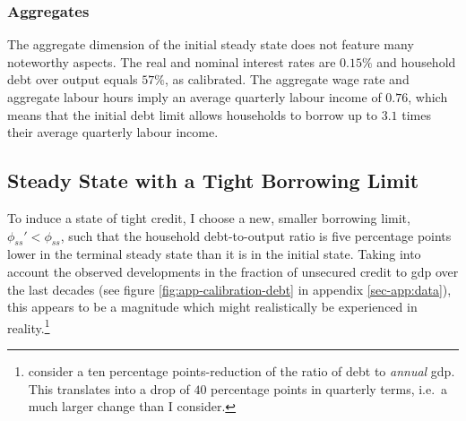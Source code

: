 \documentclass[12pt]{article} %
\numberwithin{equation}{section} %
\numberwithin{figure}{section}
\numberwithin{table}{section}
\begin{document}



\subsubsection*{Aggregates}

The aggregate dimension of the initial steady state does not feature many noteworthy aspects. The real and nominal interest rates are $0.15\%$ and household debt over output equals $57\%$, as calibrated. The aggregate wage rate and aggregate labour hours imply an average quarterly labour income of $0.76$, which means that the initial debt limit allows households to borrow up to $3.1$ times their average quarterly labour income. 

\subsection{Steady State with a Tight Borrowing Limit}
\label{sec:limit-stst-tight}

To induce a state of tight credit, I choose a new, smaller borrowing limit, $\phi_{ss}' < \phi_{ss}$, such that the household debt-to-output ratio is five percentage points lower in the terminal steady state than it is in the initial state. Taking into account the observed developments in the fraction of unsecured credit to \Gls{gdp} over the last decades (see figure \ref{fig:app-calibration-debt} in appendix \ref{sec-app:data}), this appears to be a magnitude which might realistically be experienced in reality.\footnote{\textcite{gl2017} consider a ten percentage points-reduction of the ratio of debt to \textit{annual} \Gls{gdp}. This translates into a drop of $40$ percentage points in quarterly terms, i.e.~a much larger change than I consider.} 
\end{document}
